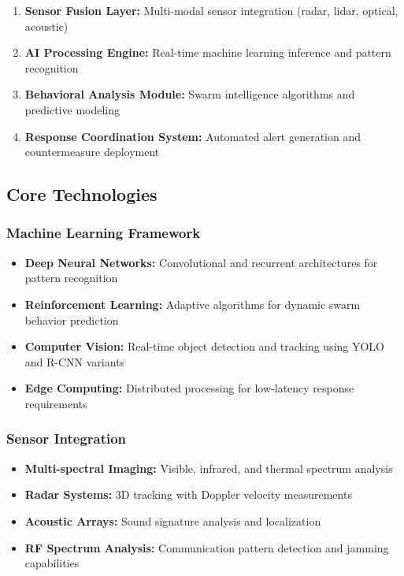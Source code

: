 \documentclass[11pt,a4paper]{article}
\begin{document}
\begin{enumerate}[leftmargin=2em]
    \item \textbf{Sensor Fusion Layer:} Multi-modal sensor integration (radar, lidar, optical, acoustic)
    \item \textbf{AI Processing Engine:} Real-time machine learning inference and pattern recognition
    \item \textbf{Behavioral Analysis Module:} Swarm intelligence algorithms and predictive modeling
    \item \textbf{Response Coordination System:} Automated alert generation and countermeasure deployment
\end{enumerate}

\subsection{Core Technologies}

\subsubsection{Machine Learning Framework}
\begin{itemize}[leftmargin=2em]
    \item \textbf{Deep Neural Networks:} Convolutional and recurrent architectures for pattern recognition
    \item \textbf{Reinforcement Learning:} Adaptive algorithms for dynamic swarm behavior prediction
    \item \textbf{Computer Vision:} Real-time object detection and tracking using YOLO and R-CNN variants
    \item \textbf{Edge Computing:} Distributed processing for low-latency response requirements
\end{itemize}

\subsubsection{Sensor Integration}
\begin{itemize}[leftmargin=2em]
    \item \textbf{Multi-spectral Imaging:} Visible, infrared, and thermal spectrum analysis
    \item \textbf{Radar Systems:} 3D tracking with Doppler velocity measurements
    \item \textbf{Acoustic Arrays:} Sound signature analysis and localization
    \item \textbf{RF Spectrum Analysis:} Communication pattern detection and jamming capabilities
\end{itemize}
\end{document}
